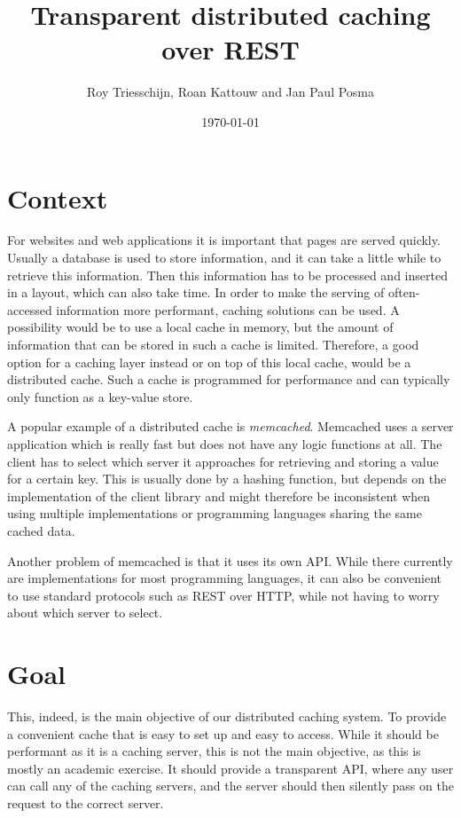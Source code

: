 \documentclass[11pt]{article}
\begin{document}
\author{Roy Triesschijn, Roan Kattouw and Jan Paul Posma}
\date{\today}
\title{Transparent distributed caching over REST}

\maketitle

\section*{Context}
For websites and web applications it is important that pages are served quickly. Usually a database is used to store information, and it can take a little while to retrieve this information. Then this information has to be processed and inserted in a layout, which can also take time. In order to make the serving of often-accessed information more performant, caching solutions can be used. A possibility would be to use a local cache in memory, but the amount of information that can be stored in such a cache is limited. Therefore, a good option for a caching layer instead or on top of this local cache, would be a distributed cache. Such a cache is programmed for performance and can typically only function as a key-value store.

A popular example of a distributed cache is \emph{memcached}. Memcached uses a server application which is really fast but does not have any logic functions at all. The client has to select which server it approaches for retrieving and storing a value for a certain key. This is usually done by a hashing function, but depends on the implementation of the client library and might therefore be inconsistent when using multiple implementations or programming languages sharing the same cached data.

Another problem of memcached is that it uses its own API. While there currently are implementations for most programming languages, it can also be convenient to use standard protocols such as REST over HTTP, while not having to worry about which server to select.

\section*{Goal}
This, indeed, is the main objective of our distributed caching system. To provide a convenient cache that is easy to set up and easy to access. While it should be performant as it is a caching server, this is not the main objective, as this is mostly an academic exercise. It should provide a transparent API, where any user can call any of the caching servers, and the server should then silently pass on the request to the correct server.
\end{document}
